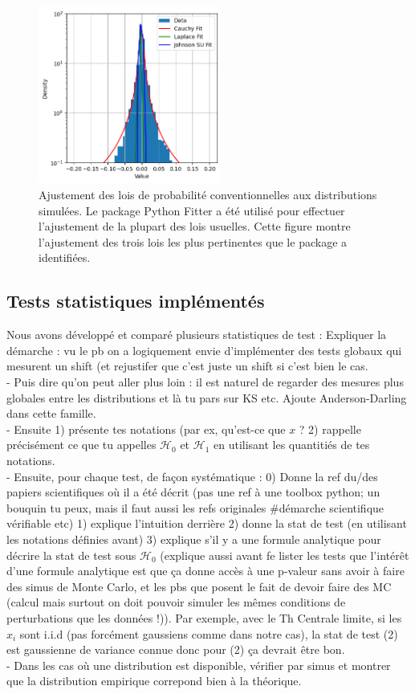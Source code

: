 \documentclass{article}
\newcommand{\dm}[1]{{\color{mulberry} #1}}
\begin{document}
\begin{figure}[H]
\centering
\includegraphics[width=6cm]{img/fits.png}
\caption{Ajustement des lois de probabilité conventionnelles aux distributions simulées. Le package Python Fitter a été utilisé pour effectuer l'ajustement de la plupart des lois usuelles. Cette figure montre l'ajustement des trois lois les plus pertinentes que le package a identifiées.}
\label{fig:fits}
\end{figure}

\subsection{Tests statistiques implémentés}

Nous avons développé et comparé plusieurs statistiques de test :
\dm{Expliquer la démarche : vu le pb on a logiquement envie d'implémenter  des tests globaux qui mesurent un shift (et rejustifer que c'est juste un shift si c'est bien le cas.\\
- Puis dire qu'on peut aller plus loin : il est naturel de regarder des mesures plus globales entre les distributions et là tu pars sur  KS etc. Ajoute Anderson-Darling dans cette famille.\\
- Ensuite 1) présente tes notations (par ex, qu'est-ce que $x$ ? 2) rappelle précisément ce que tu appelles $\mathcal{H}_0$ et $\mathcal{H}_1$ en utilisant les quantitiés de  tes notations.\\
- Ensuite, pour chaque test, de façon systématique : 0) Donne la ref du/des papiers scientifiques où il a été décrit (pas une ref à une toolbox python; un bouquin tu peux, mais il faut aussi les refs originales \#démarche scientifique vérifiable etc) 1) explique l'intuition derrière 2) donne la stat de test (en utilisant les notations définies avant) 3) explique s'il y a une formule analytique pour décrire la stat de test sous $\mathcal{H}_0$ (explique aussi avant fe lister les tests  que l'intérêt d'une formule analytique est  que ça donne accès à une p-valeur sans avoir à faire des simus de Monte Carlo, et les pbs que posent le fait de devoir faire des MC (calcul mais surtout on doit pouvoir simuler les mêmes conditions de perturbations que les données !)). Par exemple, avec le Th Centrale limite, si les $x_i$ sont i.i.d (pas forcément gaussiens comme dans notre cas), la stat de test (2) est gaussienne de variance connue donc pour (2) ça devrait être bon.\\
- Dans les cas où une distribution est disponible, vérifier par simus et montrer que la distribution empirique correpond bien à la théorique.}
\end{document}
